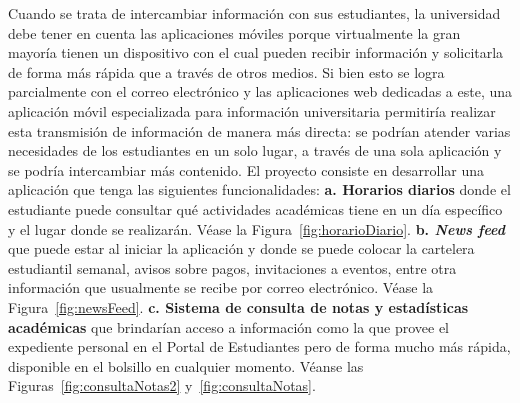 \documentclass[12pt]{article}
\begin{document}
Cuando se trata de intercambiar información con sus estudiantes, la universidad debe tener en cuenta las aplicaciones móviles porque virtualmente la gran mayor\'ia tienen un dispositivo con el cual pueden recibir información y solicitarla de forma más rápida que a través de otros medios. Si bien esto se logra parcialmente con el correo electrónico y las aplicaciones web dedicadas a este, una aplicación m\'ovil especializada para información universitaria permitiría realizar esta transmisi\'on de informaci\'on de manera más directa: se podrían atender varias necesidades de los estudiantes en un solo lugar, a través de una sola aplicación y se podría intercambiar más contenido.
\newline El proyecto consiste en desarrollar una aplicación que tenga las siguientes funcionalidades: 
\newline
\newline
\textbf{a. Horarios diarios} donde el estudiante puede consultar qué actividades académicas tiene en un día específico y el lugar donde se realizarán. Véase la Figura~\ref{fig:horarioDiario}.
\newline
\newline
\textbf{b. \textit{News feed}} que puede estar al iniciar la aplicación y donde se puede colocar la cartelera estudiantil semanal, avisos sobre pagos, invitaciones a eventos, entre otra información que usualmente se recibe por correo electrónico. Véase la Figura~\ref{fig:newsFeed}.  
\newline
\newline
\textbf{c. Sistema de consulta de notas y estadísticas académicas} que brindarían acceso a información como la que provee el expediente personal en el Portal de Estudiantes pero de forma mucho más rápida, disponible en el bolsillo en cualquier momento. Véanse las Figuras~\ref{fig:consultaNotas2} y~\ref{fig:consultaNotas}.
\\
\end{document}
